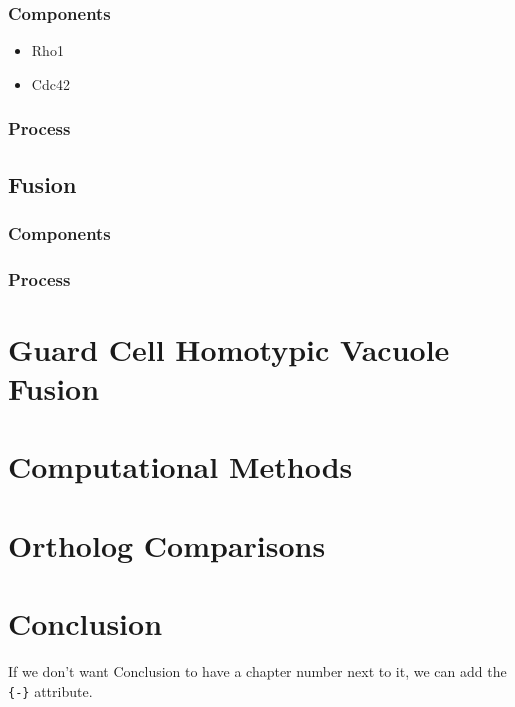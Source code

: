 \documentclass[12pt,twoside]{reedthesis}
\providecommand{\tightlist}{%
  \setlength{\itemsep}{0pt}\setlength{\parskip}{0pt}}
\begin{document}
\subsection{Components}\label{components-2}

\begin{itemize}
\tightlist
\item
  Rho1
\item
  Cdc42
\end{itemize}

\subsection{Process}\label{process-2}

\section{Fusion}\label{fusion}

\subsection{Components}\label{components-3}

\subsection{Process}\label{process-3}

\chapter{Guard Cell Homotypic Vacuole Fusion}\label{GuardFusion}

\chapter{Computational Methods}\label{CompMethods}

\chapter{Ortholog Comparisons}\label{OrthoComp}

\chapter*{Conclusion}\label{conclusion}

If we don't want Conclusion to have a chapter number next to it, we can add the \texttt{\{-\}} attribute.
\end{document}
